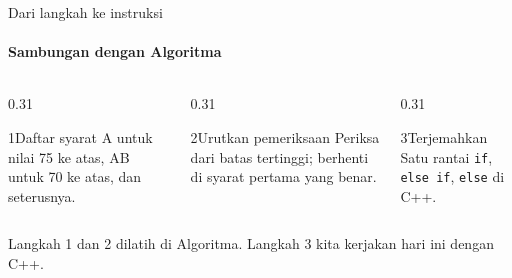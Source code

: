 \documentclass[t]{beamer}
\begin{document}
\begin{frame}{Dari langkah ke instruksi}
\framesubtitle{Sambungan dengan Algoritma}
\begin{columns}[T]
\begin{column}{0.31\textwidth}
\begin{Langkah}{1}{Daftar syarat}
A untuk nilai 75 ke atas, AB untuk 70 ke atas, dan seterusnya.
\end{Langkah}
\end{column}
\begin{column}{0.31\textwidth}
\begin{Langkah}{2}{Urutkan pemeriksaan}
Periksa dari batas tertinggi; berhenti di syarat pertama yang benar.
\end{Langkah}
\end{column}
\begin{column}{0.31\textwidth}
\begin{Langkah}{3}{Terjemahkan}
Satu rantai \texttt{if}, \texttt{else if}, \texttt{else} di C++.
\end{Langkah}
\end{column}
\end{columns}
\vspace{10pt}
Langkah 1 dan 2 dilatih di Algoritma. Langkah 3 kita kerjakan hari ini dengan C++.
\end{frame}

\end{document}
